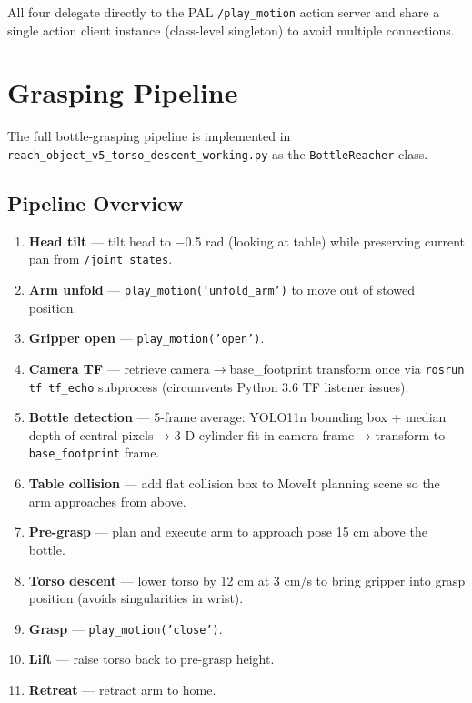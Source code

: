 \documentclass[12pt,a4paper]{report}
\begin{document}
All four delegate directly to the PAL \texttt{/play\_motion} action server and share
a single action client instance (class-level singleton) to avoid multiple connections.

\chapter{Grasping Pipeline}
\label{ch:grasp}

The full bottle-grasping pipeline is implemented in
\texttt{reach\_object\_v5\_torso\_descent\_working.py} as the \texttt{BottleReacher} class.

\section{Pipeline Overview}

\begin{enumerate}
  \item \textbf{Head tilt} — tilt head to $-$0.5 rad (looking at table) while preserving
        current pan from \texttt{/joint\_states}.
  \item \textbf{Arm unfold} — \texttt{play\_motion('unfold\_arm')} to move out of
        stowed position.
  \item \textbf{Gripper open} — \texttt{play\_motion('open')}.
  \item \textbf{Camera TF} — retrieve camera$\to$base\_footprint transform once via
        \texttt{rosrun tf tf\_echo} subprocess (circumvents Python 3.6 TF listener issues).
  \item \textbf{Bottle detection} — 5-frame average: YOLO11n bounding box + median depth
        of central pixels → 3-D cylinder fit in camera frame → transform to
        \texttt{base\_footprint} frame.
  \item \textbf{Table collision} — add flat collision box to MoveIt planning scene so the
        arm approaches from above.
  \item \textbf{Pre-grasp} — plan and execute arm to approach pose 15 cm above the bottle.
  \item \textbf{Torso descent} — lower torso by 12 cm at 3 cm/s to bring gripper into
        grasp position (avoids singularities in wrist).
  \item \textbf{Grasp} — \texttt{play\_motion('close')}.
  \item \textbf{Lift} — raise torso back to pre-grasp height.
  \item \textbf{Retreat} — retract arm to home.
\end{enumerate}
\end{document}
